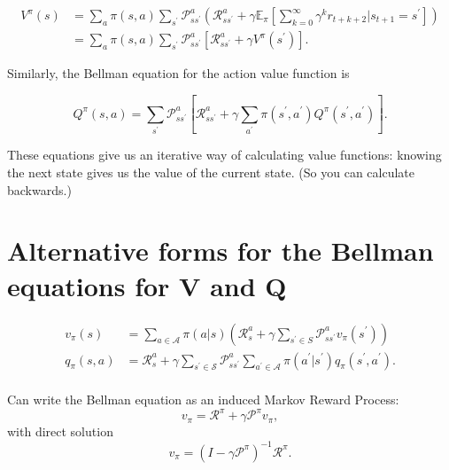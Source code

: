 \documentclass[10pt]{article}
\theoremstyle{plain}
\theoremstyle{definition}
\theoremstyle{remark}
\newcommand{\0}{\varnothing}
\newcommand{\<}{\langle}
\renewcommand{\>}{\rangle}
\begin{document}
\begin{align*}
V ^ { \pi } ( s ) &= \sum _ { a } \pi ( s , a ) \sum _ { s ^ { \prime } } \mathcal { P } _ { s s ^ { \prime } } ^ { a } \left( \mathcal { R } _ { s s ^ { \prime } } ^ { a } + \gamma \mathbb { E } _ { \pi } \left[ \sum _ { k = 0 } ^ { \infty } \gamma ^ { k } r _ { t + k + 2 } \bigg| s _ { t + 1 } = s ^ { \prime } \right] \right) \\
&= \sum _ { a } \pi ( s , a ) \sum _ { s ^ { \prime } } \mathcal { P } _ { s s ^ { \prime } } ^ { a } \left[ \mathcal { R } _ { s s ^ { \prime } } ^ { a } + \gamma V ^ { \pi } \left( s ^ { \prime } \right) \right].
\end{align*}

Similarly, the Bellman equation for the action value function is

\[
Q ^ { \pi } ( s , a ) = \sum _ { s ^ { \prime } } \mathcal { P } _ { s s ^ { \prime } } ^ { a } \left[ \mathcal { R } _ { s s ^ { \prime } } ^ { a } + \gamma \sum _ { a ^ { \prime } } \pi \left( s ^ { \prime } , a ^ { \prime } \right) Q ^ { \pi } \left( s ^ { \prime } , a ^ { \prime } \right) \right].
\]

These equations give us an iterative way of calculating value functions: knowing the next state gives us the value of the current state. (So you can calculate backwards.)

\section{Alternative forms for the Bellman equations for V and Q}

\begin{align*}
v _ { \pi } ( s ) &= \sum _ { a \in \mathcal { A } } \pi ( a | s ) \left( \mathcal { R } _ { s } ^ { a } + \gamma \sum _ { s ^ { \prime } \in S } \mathcal { P } _ { s s ^ { \prime } } ^ { a } v _ { \pi } \left( s ^ { \prime } \right) \right) \\
q _ { \pi } ( s , a ) &= \mathcal { R } _ { s } ^ { a } + \gamma \sum _ { s ^ { \prime } \in \mathcal { S } } \mathcal { P } _ { s s ^ { \prime } } ^ { a } \sum _ { a ^ { \prime } \in \mathcal { A } } \pi \left( a ^ { \prime } | s ^ { \prime } \right) q _ { \pi } \left( s ^ { \prime } , a ^ { \prime } \right). \\
\end{align*}

Can write the Bellman equation as an induced Markov Reward Process:
\[
v _ { \pi } = \mathcal { R } ^ { \pi } + \gamma \mathcal { P } ^ { \pi } v _ { \pi },
\]
with direct solution
\[
v _ { \pi } = \left( I - \gamma \mathcal { P } ^ { \pi } \right) ^ { - 1 } \mathcal { R } ^ { \pi }.
\]
\end{document}
